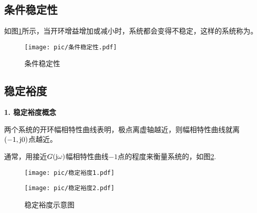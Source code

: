 \subsection{条件稳定性}
\vspace*{-0.5em}
如图\ref{条件稳定性}所示，当开环增益增加或减小时，系统都会变得不稳定，这样的系统称为。
\begin{figure}[!htb]
	\centering
	\texttt{[image: pic/条件稳定性.pdf]}
	\vspace*{-1em}
	\caption{条件稳定性}
	\label{条件稳定性}
\end{figure}

\subsection{稳定裕度}
\noindent \textbf{1. 稳定裕度概念}

两个系统的开环幅相特性曲线表明，极点离虚轴越近，则幅相特性曲线就离$(-1, \text{j}0)$点越近。

通常，用接近$G(\text{j} \omega)$幅相特性曲线$-1$点的程度来衡量系统的，如图\ref{稳定裕度1}.
\begin{figure}[!htb]
	\centering
	\begin{minipage}{0.4\linewidth}
		\centering
		\texttt{[image: pic/稳定裕度1.pdf]}
	\end{minipage}
	\begin{minipage}{0.4\linewidth}
		\centering
		\texttt{[image: pic/稳定裕度2.pdf]}
	\end{minipage}
	\caption{稳定裕度示意图}
	\label{稳定裕度1}
\end{figure}

